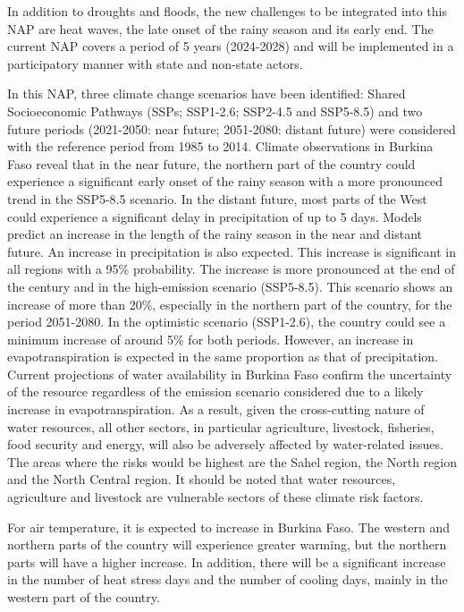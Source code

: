 \documentclass[
]{book}
\begin{document}
In addition to droughts and floods, the new challenges to be integrated into this NAP are heat waves, the late onset of the rainy season and its early end. The current NAP covers a period of 5 years (2024-2028) and will be implemented in a participatory manner with state and non-state actors.

In this NAP, three climate change scenarios have been identified: Shared Socioeconomic Pathways (SSPs; SSP1-2.6; SSP2-4.5 and SSP5-8.5) and two future periods (2021-2050: near future; 2051-2080: distant future) were considered with the reference period from 1985 to 2014. Climate observations in Burkina Faso reveal that in the near future, the northern part of the country could experience a significant early onset of the rainy season with a more pronounced trend in the SSP5-8.5 scenario. In the distant future, most parts of the West could experience a significant delay in precipitation of up to 5 days. Models predict an increase in the length of the rainy season in the near and distant future. An increase in precipitation is also expected. This increase is significant in all regions with a 95\% probability. The increase is more pronounced at the end of the century and in the high-emission scenario (SSP5-8.5). This scenario shows an increase of more than 20\%, especially in the northern part of the country, for the period 2051-2080. In the optimistic scenario (SSP1-2.6), the country could see a minimum increase of around 5\% for both periods. However, an increase in evapotranspiration is expected in the same proportion as that of precipitation. Current projections of water availability in Burkina Faso confirm the uncertainty of the resource regardless of the emission scenario considered due to a likely increase in evapotranspiration. As a result, given the cross-cutting nature of water resources, all other sectors, in particular agriculture, livestock, fisheries, food security and energy, will also be adversely affected by water-related issues. The areas where the risks would be highest are the Sahel region, the North region and the North Central region. It should be noted that water resources, agriculture and livestock are vulnerable sectors of these climate risk factors.

For air temperature, it is expected to increase in Burkina Faso. The western and northern parts of the country will experience greater warming, but the northern parts will have a higher increase. In addition, there will be a significant increase in the number of heat stress days and the number of cooling days, mainly in the western part of the country.
\end{document}
